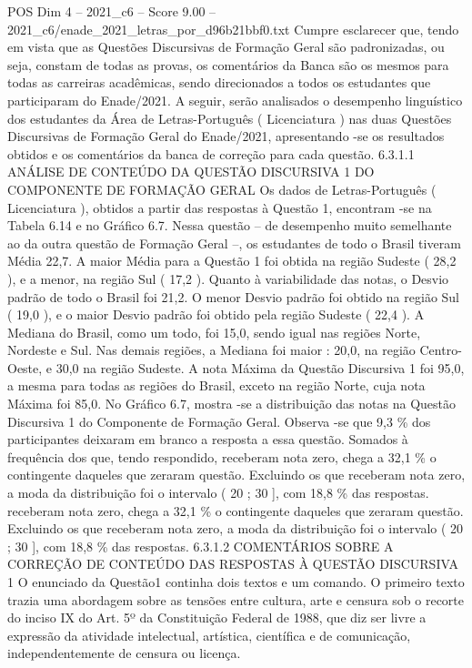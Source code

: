 \begin{textsample}{POS Dim 4 – 2021\_c6 – Score 9.00 – 2021\_c6/enade\_2021\_letras\_por\_d96b21bbf0.txt}
Cumpre esclarecer que, tendo em vista que as Questões Discursivas de Formação Geral são padronizadas, ou seja, constam de todas as provas, os comentários da Banca são os mesmos para todas as carreiras acadêmicas, sendo direcionados a todos os estudantes que participaram do Enade/2021.
A seguir, serão analisados o desempenho linguístico dos estudantes da Área de Letras-Português ( Licenciatura ) nas duas Questões Discursivas de Formação Geral do Enade/2021, apresentando -se os resultados obtidos e os comentários da banca de correção para cada questão. 6.3.1.1 ANÁLISE DE CONTEÚDO DA QUESTÃO DISCURSIVA 1 DO COMPONENTE DE FORMAÇÃO GERAL Os dados de Letras-Português ( Licenciatura ), obtidos a partir das respostas à Questão 1, encontram -se na Tabela 6.14 e no Gráfico 6.7.
Nessa questão – de desempenho muito semelhante ao da outra questão de Formação Geral –, os estudantes de todo o Brasil tiveram Média 22,7.
A maior Média para a Questão 1 foi obtida na região Sudeste ( 28,2 ), e a menor, na região Sul ( 17,2 ).
Quanto à variabilidade das notas, o Desvio padrão de todo o Brasil foi 21,2.
O menor Desvio padrão foi obtido na região Sul ( 19,0 ), e o maior Desvio padrão foi obtido pela região Sudeste ( 22,4 ).
A Mediana do Brasil, como um todo, foi 15,0, sendo igual nas regiões Norte, Nordeste e Sul.
Nas demais regiões, a Mediana foi maior : 20,0, na região Centro-Oeste, e 30,0 na região Sudeste.
A nota Máxima da Questão Discursiva 1 foi 95,0, a mesma para todas as regiões do Brasil, exceto na região Norte, cuja nota Máxima foi 85,0.
No Gráfico 6.7, mostra -se a distribuição das notas na Questão Discursiva 1 do Componente de Formação Geral.
Observa -se que 9,3 \% dos participantes deixaram em branco a resposta a essa questão.
Somados à frequência dos que, tendo respondido, receberam nota zero, chega a 32,1 \% o contingente daqueles que zeraram questão.
Excluindo os que receberam nota zero, a moda da distribuição foi o intervalo ( 20 ; 30 ], com 18,8 \% das respostas. receberam nota zero, chega a 32,1 \% o contingente daqueles que zeraram questão.
Excluindo os que receberam nota zero, a moda da distribuição foi o intervalo ( 20 ; 30 ], com 18,8 \% das respostas. 6.3.1.2 COMENTÁRIOS SOBRE A CORREÇÃO DE CONTEÚDO DAS RESPOSTAS À QUESTÃO DISCURSIVA 1 O enunciado da Questão1 continha dois textos e um comando.
O primeiro texto trazia uma abordagem sobre as tensões entre cultura, arte e censura sob o recorte do inciso IX do Art. 5º da Constituição Federal de 1988, que diz ser livre a expressão da atividade intelectual, artística, científica e de comunicação, independentemente de censura ou licença.

\end{textsample}
